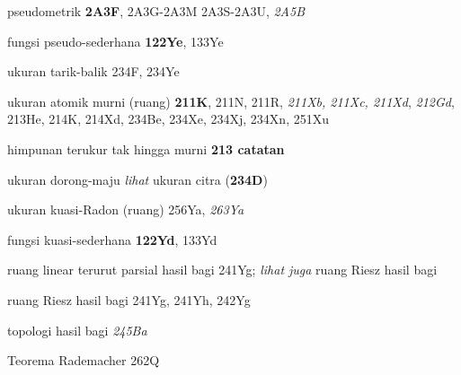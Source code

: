 pseudometrik {\bf 2A3F},
2A3G-2A3M 
2A3S-2A3U, 
{\it 2A5B}





fungsi pseudo-sederhana {\bf 122Ye}, 133Ye



ukuran tarik-balik 234F, 234Ye




ukuran atomik murni (ruang) {\bf 211K}, 211N, 211R, {\it 211Xb, 211Xc, 211Xd},
{\it 212Gd}, 213He, 214K, 214Xd, 234Be, 234Xe, 234Xj, 234Xn, 251Xu


himpunan terukur tak hingga murni {\bf 213 catatan}




ukuran dorong-maju
{\it lihat} ukuran citra ({\bf 234D})




\indexmedskip
















ukuran kuasi-Radon (ruang) 256Ya, {\it 263Ya}




fungsi kuasi-sederhana {\bf 122Yd}, 133Yd
















ruang linear terurut parsial hasil bagi 241Yg;
  {\it lihat juga} ruang Riesz hasil bagi


ruang Riesz hasil bagi 241Yg, 241Yh, 242Yg






topologi hasil bagi {\it 245Ba}


\indexmedskip

Teorema Rademacher 262Q


